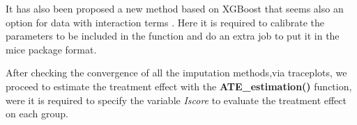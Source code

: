 \documentclass[
  letterpaper,
  DIV=11,
  numbers=noendperiod]{scrreprt}
\newenvironment{Shaded}{\begin{snugshade}}{\end{snugshade}}
\newcommand{\AttributeTok}[1]{\textcolor[rgb]{0.40,0.45,0.13}{#1}}
\newcommand{\ConstantTok}[1]{\textcolor[rgb]{0.56,0.35,0.01}{#1}}
\newcommand{\DecValTok}[1]{\textcolor[rgb]{0.68,0.00,0.00}{#1}}
\newcommand{\FloatTok}[1]{\textcolor[rgb]{0.68,0.00,0.00}{#1}}
\newcommand{\FunctionTok}[1]{\textcolor[rgb]{0.28,0.35,0.67}{#1}}
\newcommand{\NormalTok}[1]{\textcolor[rgb]{0.00,0.23,0.31}{#1}}
\newcommand{\OtherTok}[1]{\textcolor[rgb]{0.00,0.23,0.31}{#1}}
\newcommand{\SpecialCharTok}[1]{\textcolor[rgb]{0.37,0.37,0.37}{#1}}
\newcommand{\StringTok}[1]{\textcolor[rgb]{0.13,0.47,0.30}{#1}}
\begin{document}
It has also been proposed a new method based on XGBoost that seems also
an option for data with interaction terms \cite{deng_multiple_2023}.
Here it is required to calibrate the parameters to be included in the
function and do an extra job to put it in the mice package format.

\begin{Shaded}
\end{Shaded}

After checking the convergence of all the imputation methods,via
traceplots, we proceed to estimate the treatment effect with the
\textbf{ATE\_estimation()} function, were it is required to specify the
variable \emph{Iscore} to evaluate the treatment effect on each group.
\end{document}
